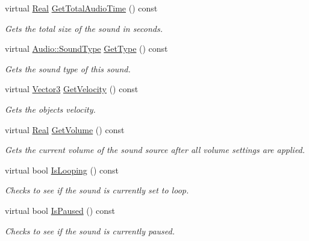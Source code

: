 \begin{DoxyCompactItemize}
virtual \hyperlink{namespaceMezzanine_a726731b1a7df72bf3583e4a97282c6f6}{Real} \hyperlink{classMezzanine_1_1Audio_1_1Sound_ae467acd6b7fc2aa594de666bec4e6dab}{GetTotalAudioTime} () const 
\begin{DoxyCompactList}\small\item\em Gets the total size of the sound in seconds. \item\end{DoxyCompactList}\item 
virtual \hyperlink{namespaceMezzanine_1_1Audio_a316b2244b8be1a8c441a39b0a246295e}{Audio::SoundType} \hyperlink{classMezzanine_1_1Audio_1_1Sound_afab6416b8ec5570568c2c1ebdc5cc398}{GetType} () const 
\begin{DoxyCompactList}\small\item\em Gets the sound type of this sound. \item\end{DoxyCompactList}\item 
virtual \hyperlink{classMezzanine_1_1Vector3}{Vector3} \hyperlink{classMezzanine_1_1Audio_1_1Sound_ac612c81165beadf27da635095bd82bb2}{GetVelocity} () const 
\begin{DoxyCompactList}\small\item\em Gets the objects velocity. \item\end{DoxyCompactList}\item 
virtual \hyperlink{namespaceMezzanine_a726731b1a7df72bf3583e4a97282c6f6}{Real} \hyperlink{classMezzanine_1_1Audio_1_1Sound_ac6fe43760b1957e2193a6ff7516d47af}{GetVolume} () const 
\begin{DoxyCompactList}\small\item\em Gets the current volume of the sound source after all volume settings are applied. \item\end{DoxyCompactList}\item 
virtual bool \hyperlink{classMezzanine_1_1Audio_1_1Sound_aae77074cbaae126241c6547afdeb131c}{IsLooping} () const 
\begin{DoxyCompactList}\small\item\em Checks to see if the sound is currently set to loop. \item\end{DoxyCompactList}\item 
virtual bool \hyperlink{classMezzanine_1_1Audio_1_1Sound_ac51d8a20e3ce5453416ef21162be2a87}{IsPaused} () const 
\begin{DoxyCompactList}\small\item\em Checks to see if the sound is currently paused. \item\end{DoxyCompactList}\item 

\end{DoxyCompactItemize}
